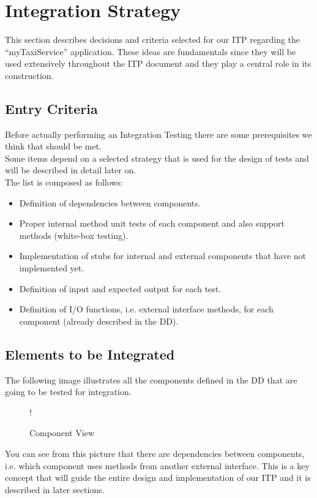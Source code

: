\break
\section{Integration Strategy}
This section describes decisions and criteria selected for our ITP regarding the ``myTaxiService'' application. These ideas are fundamentals since they will be used extensively throughout the ITP document and they play a central role in its construction.
\subsection{Entry Criteria}
Before actually performing an Integration Testing there are some prerequisites we think that should be met. \\ Some items depend on a selected strategy that is used for the design of tests and will be described in detail later on. \\
The list is composed as follows:
\begin{itemize}
	\item Definition of dependencies between components.
	\item Proper internal method unit tests of each component and also support methods (white-box testing).
	\item Implementation of stubs for internal and external components that have not implemented yet.
	\item Definition of input and expected output for each test.
	\item Definition of I/O functions, i.e. external interface methods, for each component (already described in the DD).
\end{itemize} 
\break
\subsection{Elements to be Integrated}
The following image illustrates all the components defined in the DD that are going to be tested for integration.
\begin{figure}[H]
	\centering
	\resizebox{6in}
	{!}{}
	\label{Figure 1:}\caption{ Component View}
\end{figure}
You can see from this picture that there are dependencies between components, i.e. which component uses methods from another external interface. This is a key concept that will guide the entire design and implementation of our ITP and it is described in later sections.
